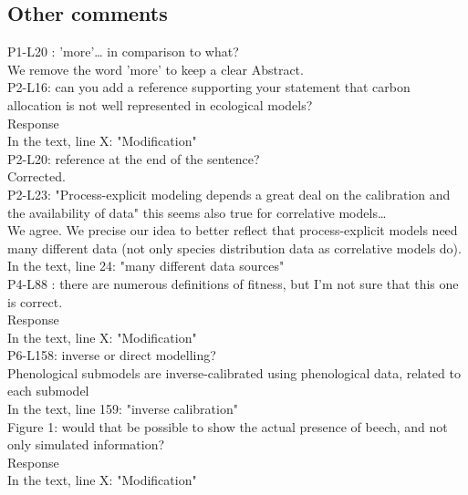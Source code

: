 \documentclass[a4paper, 11pt]{article}
\begin{document}
\subsection{Other comments}

P1-L20 : 'more'… in comparison to what?\\
\textcolor{customblue}{We remove the word 'more' to keep a clear Abstract.}\\

\noindent P2-L16: can you add a reference supporting your statement that carbon allocation is not well represented in ecological models?\\
\textcolor{customblue}{Response}\\
In the text, line X: \textcolor{customred}{"Modification"}\\ 

\noindent P2-L20: reference at the end of the sentence?\\
\textcolor{customblue}{Corrected.}\\

\noindent P2-L23: "Process-explicit modeling depends a great deal on the calibration and the availability of data" this seems also true for correlative models…\\
\textcolor{customblue}{We agree. We precise our idea to better reflect that process-explicit models need many different data (not only species distribution data as correlative models do).}\\
In the text, line 24: \textcolor{customred}{"many different data sources"}\\ 

\noindent P4-L88 : there are numerous definitions of fitness, but I'm not sure that this one is correct.\\
\textcolor{customblue}{Response}\\
In the text, line X: \textcolor{customred}{"Modification"}\\ 

\noindent P6-L158: inverse or direct modelling?\\
\textcolor{customblue}{Phenological submodels are inverse-calibrated using phenological data, related to each submodel}\\
In the text, line 159: \textcolor{customred}{"inverse calibration"}\\ 

\noindent Figure 1: would that be possible to show the actual presence of beech, and not only simulated information? \\
\textcolor{customblue}{Response}\\
In the text, line X: \textcolor{customred}{"Modification"}\\  
\end{document}
